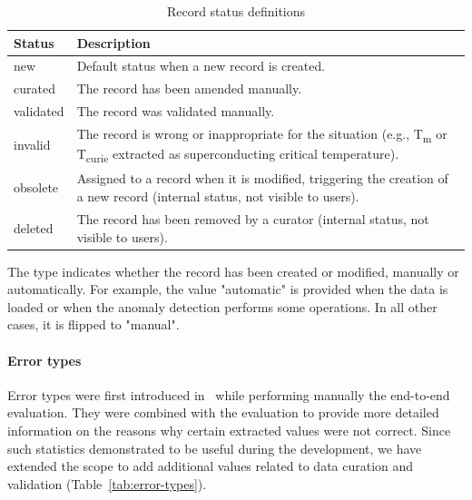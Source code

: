 \documentclass[a4paper]{article}
\begin{document}
\begin{table}[htbp]
\centering
\caption{Record status definitions}
\begin{tabular}{lp{10cm}}
\toprule
\textbf{Status} & \textbf{Description} \\
\midrule
new & Default status when a new record is created. \\
curated & The record has been amended manually. \\
validated & The record was validated manually. \\
invalid & The record is wrong or inappropriate for the situation (e.g., T\textsubscript{m} or T\textsubscript{curie} extracted as superconducting critical temperature). \\
obsolete & Assigned to a record when it is modified, triggering the creation of a new record (internal status, not visible to users).\\
deleted & The record has been removed by a curator (internal status, not visible to users). \\
\bottomrule
\end{tabular}
\label{tab:record-status}
\end{table}
    
The type indicates whether the record has been created or modified, manually or automatically. 
For example, the value "automatic" is provided when the data is loaded or when the anomaly detection performs some operations. In all other cases, it is flipped to "manual". 

\paragraph{Error types} Error types were first introduced in~\cite{lfoppiano2023automatic} while performing manually the end-to-end evaluation. They were combined with the evaluation to provide more detailed information on the reasons why certain extracted values were not correct. 
Since such statistics demonstrated to be useful during the development, we have extended the scope to add additional values related to data curation and validation (Table~\ref{tab:error-types}).
\end{document}

